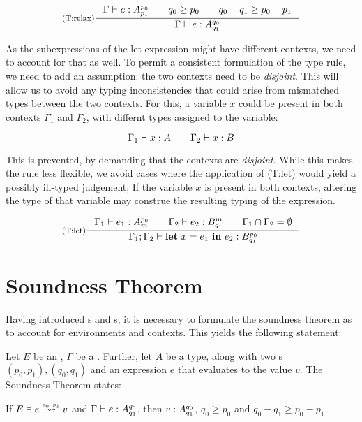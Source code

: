 \[
   \inference[(T:relax)]
   {\typing{\Gamma}{e}{\ratype{A}{p_0}{p_1}} \qquad q_0 \geq p_0 \qquad q_0 - q_1 \geq p_0 - p_1}
   {\typing{\Gamma}{e}{\ratype{A}{q_0}{q_1}}}
\]

As the subexpressions of the let expression might have different contexts, we need to account for that as well. To permit a consistent formulation of the type rule, we need to add an assumption: the two contexts need to be \emph{disjoint}. This will allow us to avoid any typing inconsistencies that could arise from mismatched types between the two contexts. 
For this, a variable \(x\) could be present in both contexts \(\Gamma_1\) and \(\Gamma_2\), with differnt types assigned to the variable:

\[
   \Gamma_1 \vdash x : A \qquad \Gamma_2 \vdash x : B
\]

This is prevented, by demanding that the contexts are \emph{disjoint}. While this makes the rule less flexible, we avoid cases where the application of (T:let) would yield a possibly ill-typed judgement; If the variable \(x\) is present in both contexts, altering the type of that variable may construe the resulting typing of the expression.

\[
   \inference[(T:let)]
   {\typing{\Gamma_1}{e_1}{\ratype{A}{p_0}{m}} \qquad \typing{\Gamma_2}{e_2}{\ratype{B}{m}{q_1}} \qquad \Gamma_1 \cap \Gamma_2 = \emptyset}
   {\typing{\Gamma_1; \Gamma_2}{\letexp{x}{e_1}{e_2}}{\ratype{B}{p_0}{q_1}}}
\]


\section{Soundness Theorem}

Having introduced s and s, it is necessary to formulate the soundness theorem as to account for environments and contexts. This yields the following statement:

\begin{theorem}\label{thm:soundness-5}
   Let \(E\) be an , \(\Gamma\) be a . Further, let \(A\) be a type, along with two s \((p_0, p_1), (q_0, q_1)\) and an expression \(e\) that evaluates to the value \(v\). The Soundness Theorem states:

   \begin{center}
   If \(\evals{E}{e}{v}{p_0}{p_1}\) and \(\Gamma \vdash e : A ^{q_0}_{q_1}\), then \(v : A ^{q_0}_{q_1}\), \(q_0 \geq p_0\) and \(q_0 - q_1 \geq p_0 - p_1\).
   \end{center}
\end{theorem}

